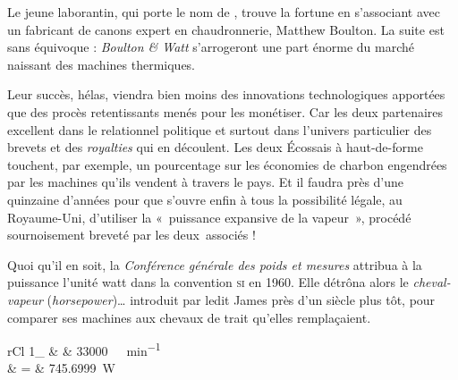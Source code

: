 	Le jeune laborantin, qui porte le nom de , trouve la fortune en s’associant avec un fabricant de canons expert en chaudronnerie, Matthew \mbox{Boulton}. La suite est sans équivoque : \textit{Boulton \& Watt} s’arrogeront une part énorme du marché naissant des machines thermiques.

	Leur succès, hélas, viendra bien moins des innovations technologiques apportées que des procès retentissants menés pour les monétiser. Car les deux partenaires excellent dans le relationnel politique et surtout dans l’univers particulier des brevets et des \textit{royalties} qui en découlent. Les deux Écossais à haut-de-forme touchent, par exemple, un pourcentage sur les économies de charbon engendrées par les machines qu’ils vendent à travers le pays. Et il faudra près d’une quinzaine d’années pour que s’ouvre enfin à tous la possibilité légale, au Royaume-Uni, d’utiliser la «~puissance expansive de la vapeur~», procédé sournoisement breveté par les deux~associés !

	Quoi qu’il en soit, la \textit{Conférence générale des poids et mesures} attribua à la puissance l’unité \si{watt} dans la convention \textsc{si} en 1960. Elle détrôna alors le \emph{cheval-vapeur} (\textit{horsepower})… introduit par ledit James près d’un siècle plus tôt, pour comparer ses machines aux chevaux de trait qu’elles remplaçaient.
	\begin{IEEEeqnarray*}{rCl}
		\SI{1}{\cheval}_ 	& \equiv & \SI{33 000}{\foot\lbf\per\minute}\\
													& = & \SI{745.6999}{\watt}
	\end{IEEEeqnarray*}
	
\atendofhistorysection
